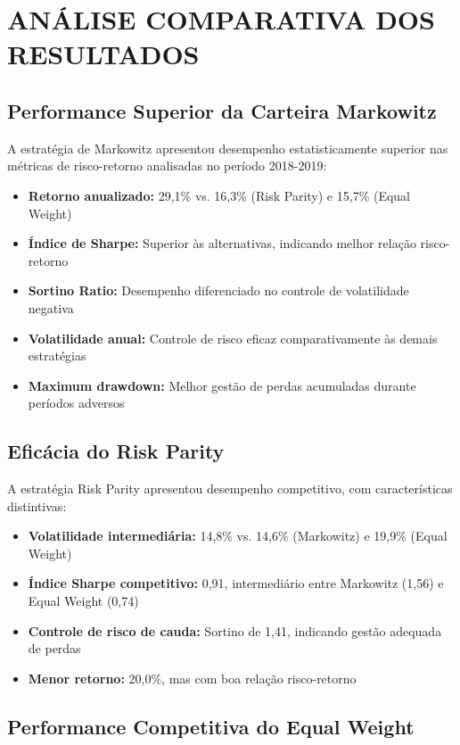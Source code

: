 \section{ANÁLISE COMPARATIVA DOS RESULTADOS}

\subsection{Performance Superior da Carteira Markowitz}

A estratégia de Markowitz apresentou desempenho estatisticamente superior nas métricas de risco-retorno analisadas no período 2018-2019:

\begin{itemize}
    \item \textbf{Retorno anualizado:} 29,1\% vs. 16,3\% (Risk Parity) e 15,7\% (Equal Weight)
    \item \textbf{Índice de Sharpe:} Superior às alternativas, indicando melhor relação risco-retorno
    \item \textbf{Sortino Ratio:} Desempenho diferenciado no controle de volatilidade negativa
    \item \textbf{Volatilidade anual:} Controle de risco eficaz comparativamente às demais estratégias
    \item \textbf{Maximum drawdown:} Melhor gestão de perdas acumuladas durante períodos adversos
\end{itemize}

\subsection{Eficácia do Risk Parity}

A estratégia Risk Parity apresentou desempenho competitivo, com características distintivas:

\begin{itemize}
    \item \textbf{Volatilidade intermediária:} 14,8\% vs. 14,6\% (Markowitz) e 19,9\% (Equal Weight)
    \item \textbf{Índice Sharpe competitivo:} 0,91, intermediário entre Markowitz (1,56) e Equal Weight (0,74)
    \item \textbf{Controle de risco de cauda:} Sortino de 1,41, indicando gestão adequada de perdas
    \item \textbf{Menor retorno:} 20,0\%, mas com boa relação risco-retorno
\end{itemize}

\subsection{Performance Competitiva do Equal Weight}

